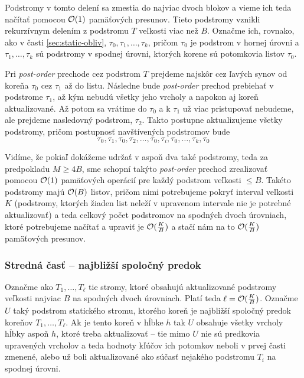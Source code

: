 Podstromy v tomto delení sa zmestia do najviac dvoch blokov a vieme ich teda načítať pomocou $\mathcal{O}(1)$ pamäťových presunov. Tieto podstromy vznikli rekurzívnym  delením z podstromu $T$ veľkosti viac než $B$. Označme ich, rovnako, ako v časti \ref{sec:static-obliv}, $\tau_0, \tau_1, \dotsc, \tau_k$, pričom $\tau_0$ je podstrom v hornej úrovni a $\tau_1,\dotsc,\tau_k$ sú podstromy v spodnej úrovni, ktorých korene sú potomkovia listov $\tau_0$.

Pri \emph{post-order} prechode cez podstrom $T$ prejdeme najskôr cez ľavých synov od koreňa $\tau_0$ cez $\tau_1$ až do listu. Následne bude \emph{post-order} prechod prebiehať v podstrome $\tau_1$, až kým nebudú všetky jeho vrcholy a napokon aj koreň aktualizované. Až potom sa vrátime do $\tau_0$ a k $\tau_1$ už viac pristupovať nebudeme, ale prejdeme nasledovný podstrom, $\tau_2$. Takto postupne aktualizujeme všetky podstromy, pričom postupnosť navštívených podstromov bude
\[
\tau_0, \tau_1, \tau_0, \tau_2, \dotsc, \tau_0, \tau_i, \tau_0, \dotsc, \tau_k, \tau_0
\]

Vidíme, že pokiaľ dokážeme udržať v \cache aspoň dva také podstromy, teda za predpokladu $M \ge 4B$, sme schopní takýto \emph{post-order} prechod zrealizovať pomocou $\mathcal{O}(1)$ pamäťových operácií pre každý podstrom veľkosti $\le B$. Takéto podstromy majú $\mathcal{O}(B)$ listov, pričom  nimi potrebujeme pokryť interval veľkosti $K$ (podstromy, ktorých žiaden list neleží v upravenom intervale nie je potrebné aktualizovať) a teda celkový počet podstromov na spodných dvoch úrovniach, ktoré potrebujeme načítať a upraviť je $\mathcal{O}(\frac{K}{B})$ a stačí nám na to $\mathcal{O}(\frac{K}{B})$ pamäťových presunov.

\subsubsection{Stredná časť -- najbližší spoločný predok}
Označme ako $T_1,\dotsc,T_\ell$ tie stromy, ktoré obsahujú aktualizované podstromy veľkosti najviac $B$ na spodných dvoch úrovniach. Platí teda $\ell = \mathcal{O}(\frac{K}{B})$. Označme $U$ taký podstrom statického stromu, ktorého koreň je najbližší spoločný predok koreňov $T_1,\dotsc,T_\ell$. Ak je tento koreň v hĺbke $h$ tak $U$ obsahuje všetky vrcholy hĺbky aspoň $h$, ktoré treba aktualizovať -- tie mimo $U$ nie sú predkovia upravených vrcholov a teda hodnoty kľúčov ich potomkov neboli v prvej časti zmenené, alebo už boli aktualizované ako súčasť nejakého podstromu $T_i$ na spodnej úrovni.

